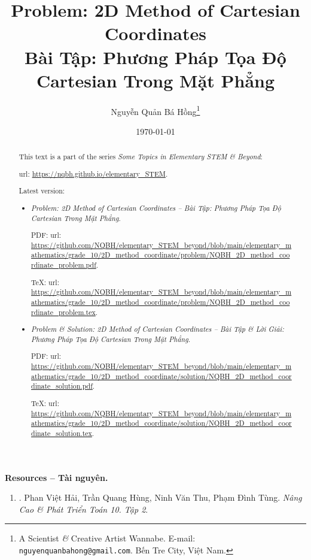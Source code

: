 \documentclass{article}
\title{Problem: 2D Method of Cartesian Coordinates\\Bài Tập: Phương Pháp Tọa Độ Cartesian Trong Mặt Phẳng}
\author{Nguyễn Quản Bá Hồng\footnote{A Scientist {\it\&} Creative Artist Wannabe. E-mail: {\tt nguyenquanbahong@gmail.com}. Bến Tre City, Việt Nam.}}
\date{\today}
\begin{document}
\maketitle
\begin{abstract}
	This text is a part of the series {\it Some Topics in Elementary STEM \& Beyond}:
	
	{\sc url}: \url{https://nqbh.github.io/elementary_STEM}.
	
	Latest version:
	\begin{itemize}
		\item {\it Problem: 2D Method of Cartesian Coordinates -- Bài Tập: Phương Pháp Tọa Độ Cartesian Trong Mặt Phẳng}.
		
		PDF: {\sc url}: \url{https://github.com/NQBH/elementary_STEM_beyond/blob/main/elementary_mathematics/grade_10/2D_method_coordinate/problem/NQBH_2D_method_coordinate_problem.pdf}.
		
		\TeX: {\sc url}: \url{https://github.com/NQBH/elementary_STEM_beyond/blob/main/elementary_mathematics/grade_10/2D_method_coordinate/problem/NQBH_2D_method_coordinate_problem.tex}.
		\item {\it Problem \& Solution: 2D Method of Cartesian Coordinates -- Bài Tập \& Lời Giải: Phương Pháp Tọa Độ Cartesian Trong Mặt Phẳng}.
		
		PDF: {\sc url}: \url{https://github.com/NQBH/elementary_STEM_beyond/blob/main/elementary_mathematics/grade_10/2D_method_coordinate/solution/NQBH_2D_method_coordinate_solution.pdf}.
		
		\TeX: {\sc url}: \url{https://github.com/NQBH/elementary_STEM_beyond/blob/main/elementary_mathematics/grade_10/2D_method_coordinate/solution/NQBH_2D_method_coordinate_solution.tex}.
	\end{itemize}
\end{abstract}
\tableofcontents


\noindent\textbf{\textsf{Resources -- Tài nguyên.}}
\begin{enumerate}
	\item \cite{Hai_Hung_Thu_Tung_ncpt_Toan_10_tap_2}. {\sc Phan Việt Hải, Trần Quang Hùng, Ninh Văn Thu, Phạm Đình Tùng}. {\it Nâng Cao \& Phát Triển Toán 10. Tập 2}.
\end{enumerate}
\end{document}
